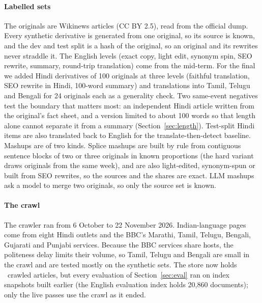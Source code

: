 \documentclass[11pt,a4paper]{article}
\newcommand{\code}[1]{\texttt{#1}}
\begin{document}
\begin{table}[t]
  \centering\small
  \caption{The data behind the system. Sizes are generated by \code{python -m spintrace.eval.dataset\_stats}.}
  \label{tab:data}
  \footnotesize
  
\end{table}

\paragraph{Labelled sets} The originals are Wikinews articles (CC BY 2.5), read from the official dump. Every synthetic derivative is generated from one original, so its source is known, and the dev and test split is a hash of the original, so an original and its rewrites never straddle it. The English levels (exact copy, light edit, synonym spin, SEO rewrite, summary, round-trip translation) come from the mid-term. For the final we added Hindi derivatives of 100 originals at three levels (faithful translation, SEO rewrite in Hindi, 100-word summary) and translations into Tamil, Telugu and Bengali for 24 originals each as a generality check. Two same-event negatives test the boundary that matters most: an independent Hindi article written from the original's fact sheet, and a version limited to about 100 words so that length alone cannot separate it from a summary (Section~\ref{sec:length}). Test-split Hindi items are also translated back to English for the translate-then-detect baseline. Mashups are of two kinds. Splice mashups are built by rule from contiguous sentence blocks of two or three originals in known proportions (the hard variant draws originals from the same week), and are also light-edited, synonym-spun or built from SEO rewrites, so the sources and the shares are exact. LLM mashups ask a model to merge two originals, so only the source set is known.

\paragraph{The crawl} The crawler ran from 6 October to 22 November 2026. Indian-language pages come from eight Hindi outlets and the BBC's Marathi, Tamil, Telugu, Bengali, Gujarati and Punjabi services. Because the BBC services share hosts, the politeness delay limits their volume, so Tamil, Telugu and Bengali are small in the crawl and are tested mostly on the synthetic sets. The store now holds \nStoreCrawl\ crawled articles, but every evaluation of Section~\ref{sec:eval} ran on index snapshots built earlier (the English evaluation index holds 20,860 documents); only the live passes use the crawl as it ended.
\end{document}
